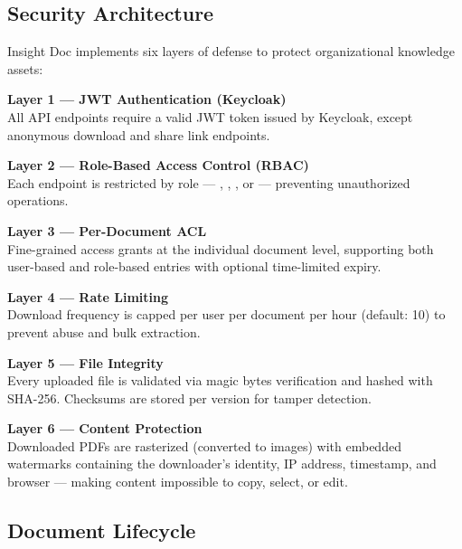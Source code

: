 \subsection{Security Architecture}

Insight Doc implements six layers of defense to protect
organizational knowledge assets:

\begin{ugSteps}
  \item \textbf{Layer 1 --- JWT Authentication (Keycloak)}\\
    All API endpoints require a valid JWT token issued by
    Keycloak, except anonymous download and share link
    endpoints.

  \item \textbf{Layer 2 --- Role-Based Access Control (RBAC)}\\
    Each endpoint is restricted by role ---
    , , ,
    or  --- preventing unauthorized operations.

  \item \textbf{Layer 3 --- Per-Document ACL}\\
    Fine-grained access grants at the individual document
    level, supporting both user-based and role-based entries
    with optional time-limited expiry.

  \item \textbf{Layer 4 --- Rate Limiting}\\
    Download frequency is capped per user per document per
    hour (default: 10) to prevent abuse and bulk extraction.

  \item \textbf{Layer 5 --- File Integrity}\\
    Every uploaded file is validated via magic bytes
    verification and hashed with SHA-256. Checksums are
    stored per version for tamper detection.

  \item \textbf{Layer 6 --- Content Protection}\\
    Downloaded PDFs are rasterized (converted to images)
    with embedded watermarks containing the downloader's
    identity, IP address, timestamp, and browser ---
    making content impossible to copy, select, or edit.
\end{ugSteps}

\subsection{Document Lifecycle}

